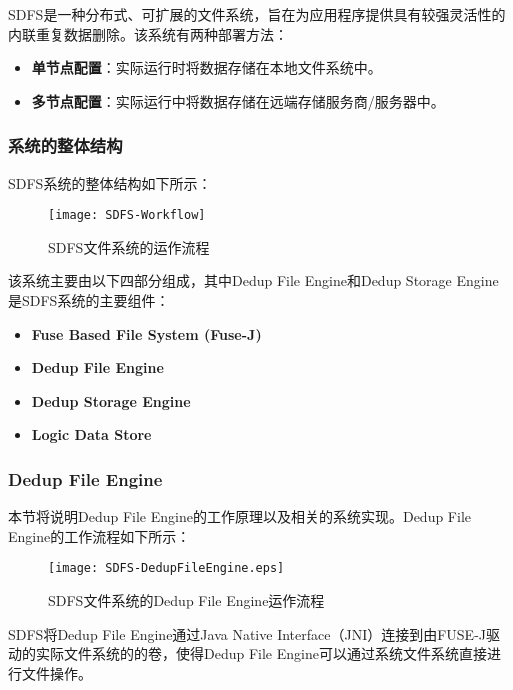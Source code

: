 SDFS\cite{SDFS}是一种分布式、可扩展的文件系统，旨在为应用程序提供具有较强灵活性的内联重复数据删除。该系统有两种部署方法：

\begin{itemize}
    \item \textbf{单节点配置}：实际运行时将数据存储在本地文件系统中。
    \item \textbf{多节点配置}：实际运行中将数据存储在远端存储服务商/服务器中。
\end{itemize}

\subsubsection{系统的整体结构}

\par SDFS系统的整体结构如下所示：

\begin{figure}[!htb]
    \small
    \centering
    \texttt{[image: SDFS-Workflow]}
    \caption{SDFS文件系统的运作流程} 
    \label{fig:SDFS-Workflow}
\end{figure}


该系统主要由以下四部分组成，其中Dedup File Engine和Dedup Storage Engine是SDFS系统的主要组件：

\begin{itemize}
    \item \textbf{Fuse Based File System (Fuse-J)}
    \item \textbf{Dedup File Engine}
    \item \textbf{Dedup Storage Engine}
    \item \textbf{Logic Data Store}
\end{itemize}


\subsubsection{Dedup File Engine}
本节将说明Dedup File Engine的工作原理以及相关的系统实现。Dedup File Engine的工作流程如下所示： 

\begin{figure}[!htb]
    \small
    \centering
    \texttt{[image: SDFS-DedupFileEngine.eps]}
    \caption{SDFS文件系统的Dedup File Engine运作流程} 
    \label{fig:SDFS-DedupFileEngine}
\end{figure}

SDFS将Dedup File Engine通过Java Native Interface（JNI）连接到由FUSE-J驱动的实际文件系统的的卷，使得Dedup File Engine可以通过系统文件系统直接进行文件操作。

